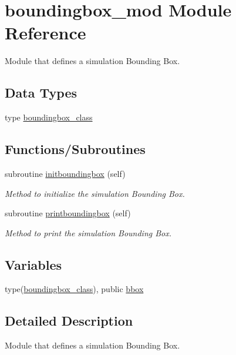 \hypertarget{namespaceboundingbox__mod}{}\section{boundingbox\+\_\+mod Module Reference}
\label{namespaceboundingbox__mod}


Module that defines a simulation Bounding Box.  


\subsection*{Data Types}
\begin{DoxyCompactItemize}
\item 
type \hyperlink{structboundingbox__mod_1_1boundingbox__class}{boundingbox\+\_\+class}
\end{DoxyCompactItemize}
\subsection*{Functions/\+Subroutines}
\begin{DoxyCompactItemize}
\item 
subroutine \hyperlink{namespaceboundingbox__mod_a35e41bb92c19802441dd8d748c3acfb4}{initboundingbox} (self)
\begin{DoxyCompactList}\small\item\em Method to initialize the simulation Bounding Box. \end{DoxyCompactList}\item 
subroutine \hyperlink{namespaceboundingbox__mod_a6ec461b758bc180dc72b5fb23169feca}{printboundingbox} (self)
\begin{DoxyCompactList}\small\item\em Method to print the simulation Bounding Box. \end{DoxyCompactList}\end{DoxyCompactItemize}
\subsection*{Variables}
\begin{DoxyCompactItemize}
\item 
type(\hyperlink{structboundingbox__mod_1_1boundingbox__class}{boundingbox\+\_\+class}), public \hyperlink{namespaceboundingbox__mod_a45e98e492bb546328c98f618a74622ec}{bbox}
\end{DoxyCompactItemize}


\subsection{Detailed Description}
Module that defines a simulation Bounding Box. 

